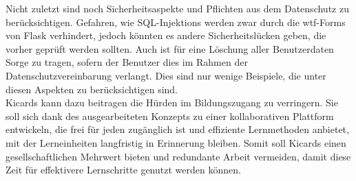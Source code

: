 \noindent Nicht zuletzt sind noch Sicherheitsaspekte und Pflichten aus dem Datenschutz zu berücksichtigen. Gefahren, wie SQL-Injektions werden zwar durch die wtf-Forms von Flask verhindert, jedoch könnten es andere Sicherheitslücken geben, die vorher geprüft werden sollten. Auch ist für eine Löschung aller Benutzerdaten Sorge zu tragen, sofern der Benutzer dies im Rahmen der Datenschutzvereinbarung verlangt. Dies sind nur wenige Beispiele, die unter diesen Aspekten zu berücksichtigen sind.\\

\noindent Kicards kann dazu beitragen die Hürden im Bildungszugang zu verringern. Sie soll sich dank des ausgearbeiteten Konzepts zu einer kollaborativen Plattform entwickeln, die frei für jeden zugänglich ist und effiziente Lernmethoden anbietet, mit der Lerneinheiten langfristig in Erinnerung bleiben. Somit soll Kicards einen gesellschaftlichen Mehrwert bieten und redundante Arbeit vermeiden, damit diese Zeit für effektivere Lernschritte genutzt werden können.

